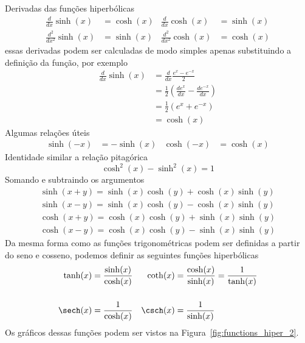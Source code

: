 Derivadas das funções hiperbólicas
\begin{align*}
\frac{d  }{dx  } \sinh(x) & = \cosh(x) & \frac{d  }{dx  } \cosh(x) & = \sinh(x) \\[3mm]
\frac{d^2}{dx^2} \sinh(x) & = \sinh(x) & \frac{d^2}{dx^2} \cosh(x) & = \cosh(x)
\end{align*}
essas derivadas podem ser calculadas de modo simples apenas substituindo a
definição da função, por exemplo
\begin{align*}
	\frac{d}{dx} \sinh(x) & = \frac{d}{dx} \frac{e^x - e^{-x}}{2}                             \\[3mm]
	                      & = \frac{1}{2} \left( \frac{de^x}{dx} - \frac{de^{-x}}{dx} \right) \\[3mm]
	                      & = \frac{1}{2} \left( e^x + e^{-x} \right)                         \\[3mm]
	                      & = \cosh(x)
\end{align*}
Algumas relações úteis
\begin{align*}
\sinh(-x) & = -\sinh(x) &
\cosh(-x) & =  \cosh(x)
\end{align*}
Identidade similar a relação pitagórica
\[ \cosh^2(x) - \sinh^2(x) = 1 \]
Somando e subtraindo os argumentos
\begin{gather*}
\sinh(x+y) = \sinh(x)\cosh(y) + \cosh(x)\sinh(y) \\
\sinh(x-y) = \sinh(x)\cosh(y) - \cosh(x)\sinh(y) \\
\cosh(x+y) = \cosh(x)\cosh(y) + \sinh(x)\sinh(y) \\
\cosh(x-y) = \cosh(x)\cosh(y) - \sinh(x)\sinh(y)
\end{gather*}
Da mesma forma como as funções trigonométricas podem ser definidas a partir do seno e
cosseno, podemos definir as seguintes funções hiperbólicas
\begin{align*}
  \tanh(x) & = \frac{\sinh(x)}{\cosh(x)} &
  \coth(x) & = \frac{\cosh(x)}{\sinh(x)} = \frac{1}{\tanh(x)}\\[5mm]
  \sech(x) & = \frac{1}{\cosh(x)}       &
  \csch(x) & = \frac{1}{\sinh(x)}
\end{align*}
Os gráficos dessas funções podem ser vistos na Figura~\ref{fig:functions_hiper_2}.

